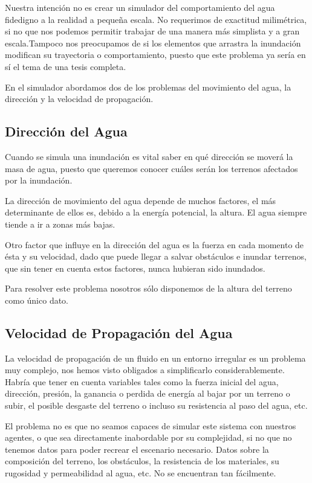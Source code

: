 Nuestra intención no es crear un simulador del comportamiento del agua
fidedigno a la realidad a pequeña escala. No requerimos de exactitud
milimétrica, si no que nos podemos permitir trabajar de una manera más
simplista y a gran escala.Tampoco nos preocupamos de si los elementos que
arrastra la inundación modifican su trayectoria o comportamiento, puesto que
este problema ya sería en sí el tema de una tesis completa.

En el simulador abordamos dos de los problemas del movimiento del agua, la
dirección y la velocidad de propagación.

\subsection{Dirección del Agua}

Cuando se simula una inundación es vital saber en qué dirección se moverá la
masa de agua, puesto que queremos conocer cuáles serán los terrenos afectados
por la inundación.

La dirección de movimiento del agua depende de muchos factores, el más
determinante de ellos es, debido a la energía potencial, la altura. El agua
siempre tiende a ir a zonas más bajas.

Otro factor que influye en la dirección del agua es la fuerza en cada momento
de ésta y su velocidad, dado que puede llegar a salvar obstáculos e inundar
terrenos, que sin tener en cuenta estos factores, nunca hubieran sido inundados.

Para resolver este problema nosotros sólo disponemos de la altura del terreno
como único dato.

\subsection{Velocidad de Propagación del Agua}

La velocidad de propagación de un fluido en un entorno irregular es un problema
muy complejo, nos hemos visto obligados a simplificarlo considerablemente.
Habría que tener en cuenta variables tales como la fuerza inicial del agua,
dirección, presión, la ganancia o perdida de energía al bajar por un terreno o
subir, el posible desgaste del terreno o incluso su resistencia al paso del
agua, etc.

El problema no es que no seamos capaces de simular este sistema con nuestros
agentes, o que sea directamente inabordable por su complejidad, si no que no
tenemos datos para poder recrear el escenario necesario. Datos sobre la
composición del terreno, los obstáculos, la resistencia de los materiales,
su rugosidad y permeabilidad al agua, etc. No se encuentran tan fácilmente.

